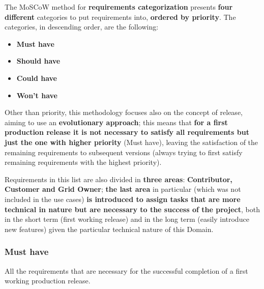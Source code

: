 \vspace{10mm}
The MoSCoW method for \textbf{requirements categorization} presents \textbf{four different} categories to put requirements into, \textbf{ordered by priority}. The categories, in descending order, are the following:
\begin{itemize}
    \item \textbf{Must have}
    \item \textbf{Should have}
    \item \textbf{Could have}
    \item \textbf{Won't have}
\end{itemize}
Other than priority, this methodology focuses also on the concept of release, aiming to use an \textbf{evolutionary approach}; this means that \textbf{for a first production release it is not necessary to satisfy all requirements but just the one with higher priority} (Must have), leaving the satisfaction of the remaining requirements to subsequent versions (always trying to first satisfy remaining requirements with the highest priority).

Requirements in this list are also divided in \textbf{three areas}: \textbf{Contributor, Customer and Grid Owner}; \textbf{the last area} in particular (which was not included in the use cases) \textbf{is introduced to assign tasks that are more technical in nature but are necessary to the success of the project}, both in the short term (first working release) and in the long term (easily introduce new features) given the particular technical nature of this Domain.

\subsubsection{Must have}
All the requirements that are necessary for the successful completion of a first working production release.

